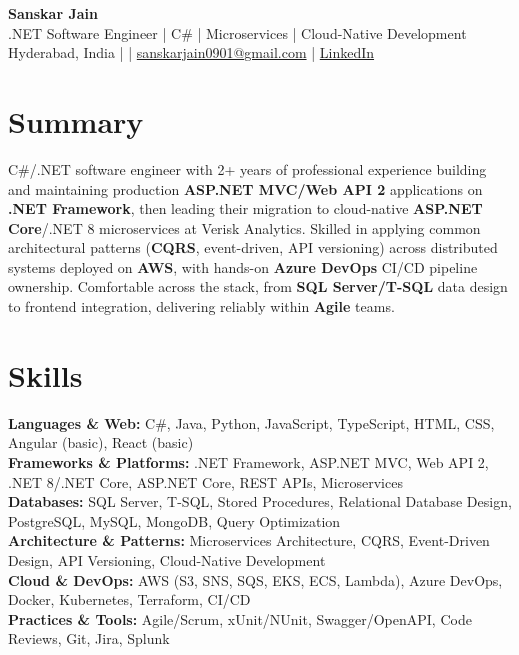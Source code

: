 \documentclass[10pt,letterpaper]{article}
\begin{document}
\begin{center}
    {\Large \textbf{Sanskar Jain}} \\
    .NET Software Engineer \;|\; C\# \;|\; Microservices \;|\; Cloud-Native Development \\
    Hyderabad, India \enspace |  \enspace | \enspace
    \href{mailto:sanskarjain0901@gmail.com}{sanskarjain0901@gmail.com} \enspace | \enspace
    \href{https://www.linkedin.com/in/sanskar-jain0901/}{LinkedIn}
\end{center}

\vspace{2pt}

\section*{Summary}
C\#/.NET software engineer with 2+ years of professional experience building and maintaining production \textbf{ASP.NET MVC/Web API 2} applications on \textbf{.NET Framework}, then leading their migration to cloud-native \textbf{ASP.NET Core}/.NET 8 microservices at Verisk Analytics. Skilled in applying common architectural patterns (\textbf{CQRS}, event-driven, API versioning) across distributed systems deployed on \textbf{AWS}, with hands-on \textbf{Azure DevOps} CI/CD pipeline ownership. Comfortable across the stack, from \textbf{SQL Server/T-SQL} data design to frontend integration, delivering reliably within \textbf{Agile} teams.

\section*{Skills}
\textbf{Languages \& Web:} C\#, Java, Python, JavaScript, TypeScript, HTML, CSS, Angular (basic), React (basic) \\
\textbf{Frameworks \& Platforms:} .NET Framework, ASP.NET MVC, Web API 2, .NET 8/.NET Core, ASP.NET Core, REST APIs, Microservices \\
\textbf{Databases:} SQL Server, T-SQL, Stored Procedures, Relational Database Design, PostgreSQL, MySQL, MongoDB, Query Optimization \\
\textbf{Architecture \& Patterns:} Microservices Architecture, CQRS, Event-Driven Design, API Versioning, Cloud-Native Development \\
\textbf{Cloud \& DevOps:} AWS (S3, SNS, SQS, EKS, ECS, Lambda), Azure DevOps, Docker, Kubernetes, Terraform, CI/CD \\
\textbf{Practices \& Tools:} Agile/Scrum, xUnit/NUnit, Swagger/OpenAPI, Code Reviews, Git, Jira, Splunk
\end{document}
